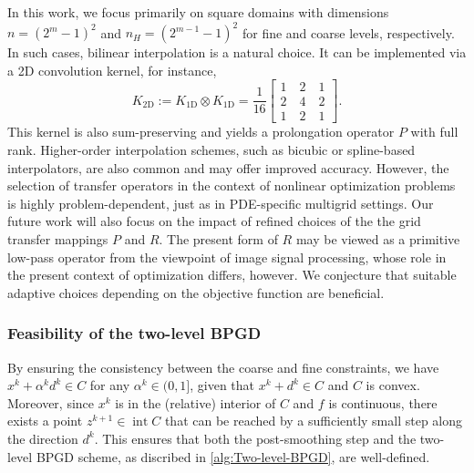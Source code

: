 \documentclass[11pt,reqno]{amsart}
\numberwithin{equation}{section}
\numberwithin{figure}{section}
\theoremstyle{plain}
\theoremstyle{definition}
\DeclareMathOperator{\intr}{int}
\begin{document}
In this work, we focus primarily on square domains with dimensions $n = (2^m-1)^2$ and $n_H = (2^{m-1}-1)^2$ for fine and coarse levels, respectively. In such cases, bilinear interpolation is a natural choice. It can be implemented via a 2D convolution kernel, for instance,
\begin{equation} \label{eq:2D-kernel}
    K_{2\text{D}} := K_{1\text{D}} \otimes K_{1\text{D}} = \frac{1}{16} \begin{bmatrix}
        1 \quad 2 \quad 1 \\ 2 \quad 4\quad 2 \\ 1 \quad 2 \quad 1 
    \end{bmatrix}.
\end{equation}
This kernel is also sum-preserving and yields a prolongation operator $P$ with full rank. Higher-order interpolation schemes, such as bicubic or spline-based interpolators, are also common and may offer improved accuracy. However, the selection of transfer operators in the context of nonlinear optimization problems is highly problem-dependent, just as in PDE-specific multigrid settings. Our future work will also focus on the impact of refined choices of the the grid transfer mappings $P$ and $R$. The present form of $R$ may be viewed as a primitive low-pass operator from the viewpoint of image signal processing, whose role in the present context of optimization differs, however. We conjecture that suitable adaptive choices depending on the objective function are beneficial.

\subsubsection{Feasibility of the two-level BPGD}\label{sec:2l-BPGD-well-defined}
By ensuring the consistency between the coarse and fine constraints, we have $x^k + \alpha^k d^k \in C$ for any $\alpha^k \in (0,1]$, given that $x^k + d^k \in C$ and $C$ is convex. Moreover, since $x^k$ is in the (relative) interior of $C$ and $f$ is continuous, there exists a point $z^{k+1} \in \intr C$ that can be reached by a sufficiently small step along the direction $d^k$. This ensures that both the post-smoothing step and the two-level BPGD scheme, as discribed in \cref{alg:Two-level-BPGD}, are well-defined.
\end{document}
